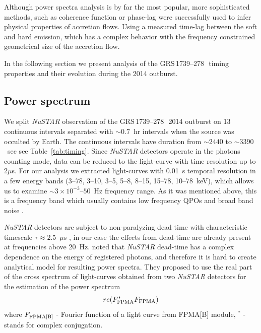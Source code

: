 \documentclass[a4paper,fleqn,usenatbib]{mnras}
\def\grs{{GRS\,1739--278\,}}
\begin{document}
Although power spectra analysis is by far the most popular, more sophisticated methods, such as coherence function or phase-lag were successfully used to infer physical properties of accretion flows. 
Using a measured time-lag between the soft and hard emission, which has a complex behavior with the frequency \citet{1999ApJ...517..355N} constrained geometrical size of the accretion flow. 


In the following section we present analysis of the \grs\ timing properties and their evolution during the 2014 outburst.

\subsection{Power spectrum}

We split {\it NuSTAR} observation of the \grs\ 2014 outburst on 13 continuous intervals separated with $\sim0.7$~hr intervals when the source was occulted by Earth. 
The continuous intervals have duration from $\sim2440$ to $\sim3390$~sec see Table~\ref{tab:timing}.
Since {\it NuSTAR} detectors operate in the photons counting mode, data can be reduced to the light-curve with time resolution up to 2$\mu$s.
For our analysis we extracted light-curves with 0.01~s temporal resolution in a few energy bands (3--78, 3--10, 3--5, 5--8, 8--15, 15--78, 10--78~keV), which allows us to examine $\sim3\times10^{-3}$--$50$~Hz frequency range.
As it was mentioned above, this is a frequency band which usually contains low frequency QPOs and broad band noise \citep{wijnands99}.

{\it NuSTAR} detectors are subject to non-paralyzing dead time with characteristic timescale $\tau \approx 2.5$~$\mu$s \citep{2015ApJ...800..109B}, in our case the effects from dead-time are already present at frequencies above 20~Hz.
\citet{2015ApJ...800..109B} noted that {\it NuSTAR} dead-time has a complex dependence on the energy of registered photons, and therefore it is hard to create analytical model for resulting power spectra. 
They proposed to use the real part of the cross spectrum of light-curves obtained from two {\it NuSTAR} detectors for the estimation of the power spectrum 
\begin{equation}
        re(F_{\rm FPMA}^{*}F_{\rm FPMA})
\end{equation}
where $F_{\rm FPMA[B]}$ - Fourier function of a light curve from FPMA[B] module, $^{*}$ - stands for complex conjugation. 
\end{document}
